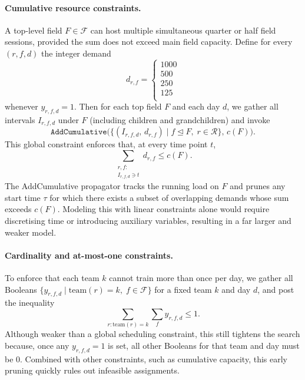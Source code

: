 \documentclass[12pt]{article}
\begin{document}
\paragraph{Cumulative resource constraints.}
A top-level field \(F\in\mathcal{F}\) can host multiple simultaneous quarter or half field sessions, provided the sum does not exceed main field capacity. Define for every \((r,f,d)\) the integer demand
\[
  d_{r,f} =
  \begin{cases}
    1000 \\
    500 \\
    250 \\
    125 \\
  \end{cases}
\]
whenever \(y_{r,f,d}=1\). Then for each top field \(F\) and each day \(d\), we gather all intervals \(I_{r,f,d}\) under \(F\) (including children and grandchildren) and invoke
\[
  \texttt{AddCumulative}\bigl(\{(I_{r,f,d},\,d_{r,f}) \mid f \trianglelefteq F,\;r\in\mathcal{R}\},\,c(F)\bigr).
\]
This global constraint enforces that, at every time point \(t\),
\[
  \sum_{\substack{r,f:\\I_{r,f,d}\ni t}} d_{r,f} \le c(F).
\]
The AddCumulative propagator tracks the running load on \(F\) and prunes any start time \(\tau\) for which there exists a subset of overlapping demands whose sum exceeds \(c(F)\). Modeling this with linear constraints alone would require discretising time or introducing auxiliary variables, resulting in a far larger and weaker model.

\paragraph{Cardinality and at-most-one constraints.}
To enforce that each team \(k\) cannot train more than once per day, we gather all Booleans \(\{y_{r,f,d}\mid \mathrm{team}(r)=k,\;f\in\mathcal{F}\}\) for a fixed team \(k\) and day \(d\), and post the inequality
\[
  \sum_{r:\mathrm{team}(r)=k}\sum_{f} y_{r,f,d} \le 1.
\]
Although weaker than a global scheduling constraint, this still tightens the search because, once any \(y_{r,f,d}=1\) is set, all other Booleans for that team and day must be 0. Combined with other constraints, such as cumulative capacity, this early pruning quickly rules out infeasible assignments.
\end{document}
